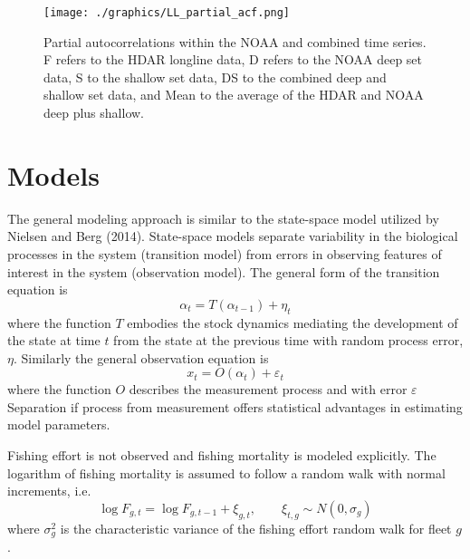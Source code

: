 \documentclass[12pt,letterpaper]{article}
\begin{document}
\begin{figure}
\begin{center}
\texttt{[image: ./graphics/LL\_partial\_acf.png]}
\caption{\label{fig:LLpartialacf}
Partial autocorrelations within the NOAA and combined time
series. F refers to the HDAR longline data, D refers to the NOAA deep
set data, S to the shallow set data,
DS to the combined deep and shallow set data, and Mean to the average
of the HDAR and NOAA deep plus shallow.
}
\end{center}
\end{figure}


\clearpage
\section*{Models}
The general modeling approach is similar to the
state-space model utilized by Nielsen and Berg (2014). 
State-space models separate variability in the biological
processes in the system (transition model)
from errors in observing features of interest
in the system (observation model). 
The general form of the transition equation is
\begin{equation}
\alpha_t=T(\alpha_{t-1}) + \eta_t
\end{equation}
where the function $T$ embodies the stock dynamics mediating the
development of the state at time $t$ from the state at the previous
time with random process error, $\eta$.
Similarly the general observation equation is
\begin{equation}
x_t = O(\alpha_t) + \varepsilon_t
\end{equation}
where the function $O$ describes the measurement process and with
error $\varepsilon$
Separation if process from measurement offers statistical advantages in
estimating model parameters.

Fishing effort is not observed and fishing mortality is
modeled explicitly. The logarithm of fishing mortality is assumed to
follow a random walk with normal increments, i.e.
\begin{equation}
\log F_{g,t} = \log F_{g,t-1} + \xi_{g,t},\qquad \xi_{t,g}\sim N(0,\sigma_g) \label{eqn:Fwalk}
\end{equation}
where  $\sigma^2_g$ is the characteristic variance of the fishing
effort random walk for fleet $g$.
\end{document}
